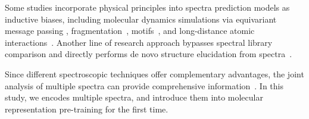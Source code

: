 Some studies incorporate physical principles into spectra prediction models as inductive biases, including molecular dynamics simulations via equivariant message passing \citep{PaiNN}, fragmentation~\citep{LC-MS,MolDiscovery,SCARF-Weave}, motifs~\citep{MoMS-Net}, and long-distance atomic interactions~\citep{MassFormer}. Another line of research approach bypasses spectral library comparison and directly performs de novo structure elucidation from spectra~\citep{MSNovelist,MIST,CNN-AM}.


Since different spectroscopic techniques offer complementary advantages, the joint analysis of multiple spectra can provide comprehensive information~\citep{multimodal-spectra}.
In this study, we encodes multiple spectra, and introduce them into molecular representation pre-training for the first time.